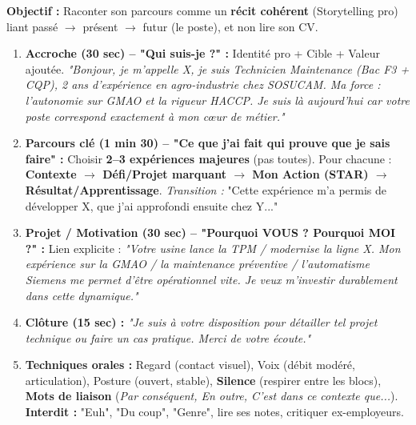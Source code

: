 \documentclass[11pt]{article}
\newcommand{\cle}[1]{{\popxbold\color{popdark}#1}}
\begin{document}
\begin{methode}
\textbf{Objectif :} Raconter son parcours comme un \textbf{récit cohérent} (Storytelling pro) liant passé $\rightarrow$ présent $\rightarrow$ futur (le poste), et non lire son CV.
\begin{enumerate}
    \item \textbf{Accroche (30 sec) -- "Qui suis-je ?" :} \cle{Identité pro + Cible + Valeur ajoutée}. \emph{"Bonjour, je m'appelle X, je suis Technicien Maintenance (Bac F3 + CQP), 2 ans d'expérience en agro-industrie chez SOSUCAM. Ma force : l'autonomie sur GMAO et la rigueur HACCP. Je suis là aujourd'hui car votre poste correspond exactement à mon cœur de métier."}
    \item \textbf{Parcours clé (1 min 30) -- "Ce que j'ai fait qui prouve que je sais faire" :} Choisir \textbf{2--3 expériences majeures} (pas toutes). Pour chacune : \textbf{Contexte $\rightarrow$ Défi/Projet marquant $\rightarrow$ Mon Action (STAR) $\rightarrow$ Résultat/Apprentissage}. \emph{Transition :} "Cette expérience m'a permis de développer X, que j'ai approfondi ensuite chez Y..."
    \item \textbf{Projet / Motivation (30 sec) -- "Pourquoi VOUS ? Pourquoi MOI ?" :} Lien explicite : \emph{"Votre usine lance la TPM / modernise la ligne X. Mon expérience sur la GMAO / la maintenance préventive / l'automatisme Siemens me permet d'être opérationnel vite. Je veux m'investir durablement dans cette dynamique."}
    \item \textbf{Clôture (15 sec) :} \emph{"Je suis à votre disposition pour détailler tel projet technique ou faire un cas pratique. Merci de votre écoute."}
    \item \textbf{Techniques orales :} Regard (contact visuel), Voix (débit modéré, articulation), Posture (ouvert, stable), \textbf{Silence} (respirer entre les blocs), \textbf{Mots de liaison} (\emph{Par conséquent, En outre, C'est dans ce contexte que...}). \textbf{Interdit :} "Euh", "Du coup", "Genre", lire ses notes, critiquer ex-employeurs.
\end{enumerate}
\end{methode}
\end{document}
